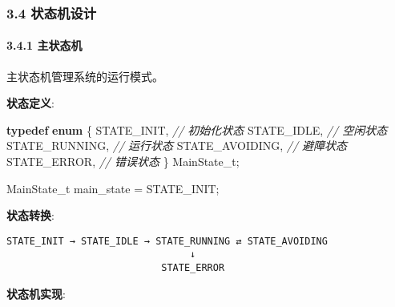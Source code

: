 \documentclass[
]{article}
\newenvironment{Shaded}{}{}
\newcommand{\CommentTok}[1]{\textcolor[rgb]{0.38,0.63,0.69}{\textit{#1}}}
\newcommand{\KeywordTok}[1]{\textcolor[rgb]{0.00,0.44,0.13}{\textbf{#1}}}
\newcommand{\NormalTok}[1]{#1}
\begin{document}
\hypertarget{ux72b6ux6001ux673aux8bbeux8ba1}{%
\subsubsection{3.4 状态机设计}\label{ux72b6ux6001ux673aux8bbeux8ba1}}

\hypertarget{ux4e3bux72b6ux6001ux673a}{%
\paragraph{3.4.1 主状态机}\label{ux4e3bux72b6ux6001ux673a}}

主状态机管理系统的运行模式。

\textbf{状态定义}:

\begin{Shaded}
\begin{Highlighting}[]
\KeywordTok{typedef} \KeywordTok{enum}\NormalTok{ \{}
\NormalTok{    STATE\_INIT,              }\CommentTok{// 初始化状态}
\NormalTok{    STATE\_IDLE,              }\CommentTok{// 空闲状态}
\NormalTok{    STATE\_RUNNING,           }\CommentTok{// 运行状态}
\NormalTok{    STATE\_AVOIDING,          }\CommentTok{// 避障状态}
\NormalTok{    STATE\_ERROR,             }\CommentTok{// 错误状态}
\NormalTok{\} MainState\_t;}

\NormalTok{MainState\_t main\_state = STATE\_INIT;}
\end{Highlighting}
\end{Shaded}

\textbf{状态转换}:

\begin{verbatim}
STATE_INIT → STATE_IDLE → STATE_RUNNING ⇄ STATE_AVOIDING
                                ↓
                           STATE_ERROR
\end{verbatim}

\textbf{状态机实现}:
\end{document}
